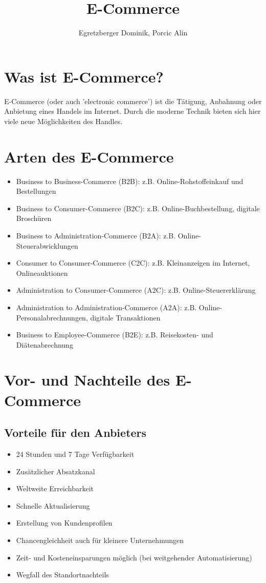 \documentclass[a4paper]{article}
\author{Egretzberger Dominik, Porcic Alin}
\title{E-Commerce}
\begin{document}
\maketitle
\newpage

\section{Was ist E-Commerce?}

E-Commerce (oder auch 'electronic commerce') ist die Tätigung, Anbahnung oder Anbietung eines Handels im Internet. Durch die moderne Technik bieten sich hier viele neue Möglichkeiten des Handles.

\section{Arten des E-Commerce}

\begin{itemize}
\item Business to Business-Commerce (B2B): z.B. Online-Rohstoffeinkauf und Bestellungen
\item Business to Consumer-Commerce (B2C): z.B. Online-Buchbestellung, digitale Broschüren
\item Business to Administration-Commerce (B2A): z.B. Online-Steuerabwicklungen
\item Consumer to Consumer-Commerce (C2C): z.B. Kleinanzeigen im Internet, Onlineauktionen
\item Administration to Consumer-Commerce (A2C): z.B. Online-Steuererklärung
\item Administration to Administration-Commerce (A2A): z.B. Online-Personalabrechnungen, digitale Transaktionen
\item Business to Employee-Commerce (B2E): z.B. Reisekosten- und Diätenabrechnung
\end{itemize}

\section{Vor- und Nachteile des E-Commerce}

\subsection{Vorteile für den Anbieters}
\begin{itemize}
\item 24 Stunden und 7 Tage Verfügbarkeit
\item Zusätzlicher Absatzkanal
\item Weltweite Erreichbarkeit
\item Schnelle Aktualisierung
\item Erstellung von Kundenprofilen
\item Chancengleichheit auch für kleinere Unternehmungen
\item Zeit- und Kosteneinsparungen möglich (bei weitgehender Automatisierung)
\item Wegfall des Standortnachteils
\end{itemize}
\end{document}
